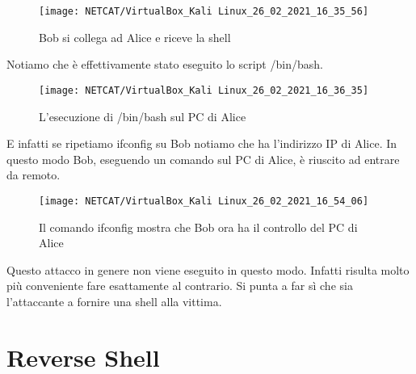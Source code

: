 \documentclass[14pt]{extreport}
\begin{document}
\vspace{5pt}



\begin{figure}[H]
    \centering
    \texttt{[image: NETCAT/VirtualBox\_Kali Linux\_26\_02\_2021\_16\_35\_56]}
    \caption{Bob si collega ad Alice e riceve la shell}
\end{figure}

Notiamo che è effettivamente stato eseguito lo script /bin/bash.



\begin{figure}[H]
    \centering
    \texttt{[image: NETCAT/VirtualBox\_Kali Linux\_26\_02\_2021\_16\_36\_35]}
    \caption{L'esecuzione di /bin/bash sul PC di Alice}
\end{figure}














E infatti se ripetiamo ifconfig su Bob notiamo che ha l'indirizzo IP di Alice. In questo modo Bob, eseguendo un comando sul PC di Alice, è riuscito ad entrare da remoto.










\begin{figure}[H]
    \centering
    \texttt{[image: NETCAT/VirtualBox\_Kali Linux\_26\_02\_2021\_16\_54\_06]}
    \caption{Il comando ifconfig mostra che Bob ora ha il controllo del PC di Alice}
\end{figure}











Questo attacco in genere non viene eseguito in questo modo. Infatti risulta molto più conveniente fare esattamente al contrario. Si punta a far sì che sia l'attaccante a fornire una shell alla vittima.




\section{Reverse Shell}
\end{document}
